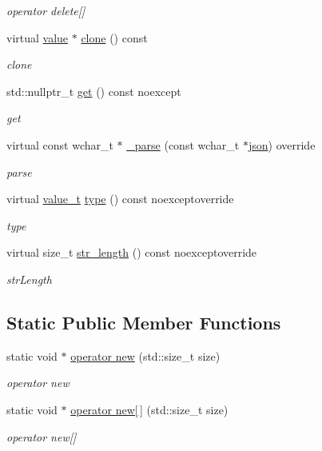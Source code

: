 \begin{DoxyCompactItemize}
\begin{DoxyCompactList}\small\item\em operator delete\mbox{[}\mbox{]} \end{DoxyCompactList}\item 
virtual \hyperlink{classformat_1_1value_aa6b85823936bf7b8ab78d3f8d443c00d}{value} $\ast$ \hyperlink{classformat_1_1undefined_af418bdce70e2d41131ac640fcf6dc121}{clone} () const 
\begin{DoxyCompactList}\small\item\em clone \end{DoxyCompactList}\item 
std\+::nullptr\+\_\+t \hyperlink{classformat_1_1undefined_a18a92924d0ce07768762f6ea64188a19}{get} () const noexcept
\begin{DoxyCompactList}\small\item\em get \end{DoxyCompactList}\item 
virtual const wchar\+\_\+t $\ast$ \hyperlink{classformat_1_1undefined_a407a10b3bfa670b2a8b1e3b8ef6cf698}{\+\_\+parse} (const wchar\+\_\+t $\ast$\hyperlink{classformat_1_1json}{json}) override
\begin{DoxyCompactList}\small\item\em parse \end{DoxyCompactList}\item 
virtual \hyperlink{classformat_1_1value_aa0334be06389a7b14af485fa0cd3aa21}{value\+\_\+t} \hyperlink{classformat_1_1undefined_a72e4ff819514b2a4126be1969d5bbabe}{type} () const noexceptoverride
\begin{DoxyCompactList}\small\item\em type \end{DoxyCompactList}\item 
virtual size\+\_\+t \hyperlink{classformat_1_1undefined_a94e5461ec5938de5aae6de2e0e9ea604}{str\+\_\+length} () const noexceptoverride
\begin{DoxyCompactList}\small\item\em str\+Length \end{DoxyCompactList}\end{DoxyCompactItemize}
\subsection*{Static Public Member Functions}
\begin{DoxyCompactItemize}
\item 
static void $\ast$ \hyperlink{classformat_1_1undefined_a574db8ca686c0072c8af1c10aad45df6}{operator new} (std\+::size\+\_\+t size)
\begin{DoxyCompactList}\small\item\em operator new \end{DoxyCompactList}\item 
static void $\ast$ \hyperlink{classformat_1_1undefined_a4afb046047cb14401e9964d452b284b5}{operator new\mbox{[}$\,$\mbox{]}} (std\+::size\+\_\+t size)
\begin{DoxyCompactList}\small\item\em operator new\mbox{[}\mbox{]} \end{DoxyCompactList}\end{DoxyCompactItemize}
